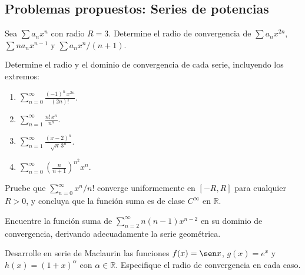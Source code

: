 \subsection{Problemas propuestos: Series de potencias}



\begin{prob} Sea $\sum a_n x^n$ con radio $R=3$. Determine el radio de
          convergencia de $\sum a_n x^{2n}$, $\sum n a_n x^{n-1}$ y
          $\sum a_n x^n / (n+1)$.
\end{prob}


\begin{prob}
 Determine el radio y el dominio de convergencia de cada
          serie, incluyendo los extremos:
          \begin{enumerate}
              \item[(a)] $\displaystyle\sum_{n=0}^\infty
                  \frac{(-1)^n\,x^{2n}}{(2n)!}$.
              \item[(b)] $\displaystyle\sum_{n=1}^\infty
                  \frac{n!\,x^n}{n^n}$.
              \item[(c)] $\displaystyle\sum_{n=1}^\infty
                  \frac{(x-2)^n}{\sqrt{n}\,3^n}$.
              \item[(d)] $\displaystyle\sum_{n=0}^\infty
                  \left(\frac{n}{n+1}\right)^{n^2} x^n$.
          \end{enumerate}

\end{prob}

\begin{prob} Pruebe que $\sum_{n=0}^\infty x^n/n!$ converge
          uniformemente en $[-R,R]$ para cualquier $R > 0$, y
          concluya que la función suma es de clase $C^\infty$ en
          $\mathbb{R}$.
\end{prob}

\begin{prob} Encuentre la función suma de
          $\sum_{n=2}^\infty n(n-1)x^{n-2}$ en su dominio de
          convergencia, derivando adecuadamente la serie geométrica.
\end{prob}

\begin{prob} Desarrolle en serie de Maclaurin las funciones
          $f(x) = \sen x$, $g(x) = e^x$ y $h(x) = (1+x)^\alpha$ con
          $\alpha \in \mathbb{R}$. Especifique el radio de
          convergencia en cada caso.
\end{prob}

